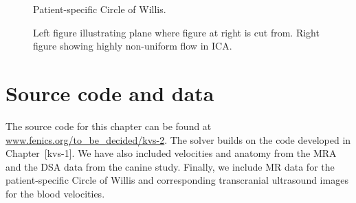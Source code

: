 \begin{figure}
  \begin{center}
  \end{center}
  \caption{Patient-specific Circle of Willis.}
  \label{fig:screenshot}
\end{figure}

\begin{figure}
  \begin{center}
    \caption{Left figure illustrating plane where figure at right is
      cut from. Right figure showing highly non-uniform flow in ICA.}
    \label{fig:cok_ica}
  \end{center}
\end{figure}

\section*{Source code and data}

The source code for this chapter can be found at
\url{www.fenics.org/to_be_decided/kvs-2}. The solver builds on the
code developed in Chapter~[kvs-1]. We have also included velocities
and anatomy from the MRA and the DSA data from the canine
study. Finally, we include MR data for the patient-specific Circle of
Willis and corresponding transcranial ultrasound images for the blood
velocities.

